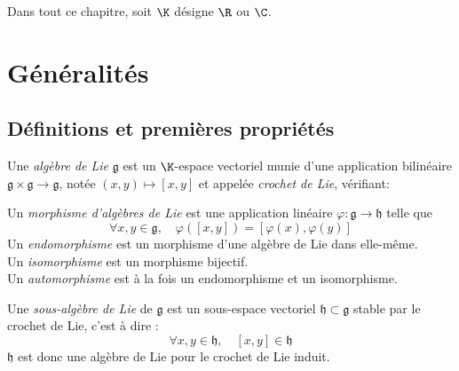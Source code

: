 
\noindent
Dans tout ce chapitre, soit $\K$ désigne $\R$ ou $\C$.
 
\section{Généralités}
\subsection{Définitions et premières propriétés}

\begin{definition}
    Une \emph{algèbre de Lie} $\mathfrak{g}$ est un $\K$-espace vectoriel munie d'une application bilinéaire $\mathfrak{g}\times \mathfrak{g} \to \mathfrak{g}$, notée $(x,y) \mapsto [x, y]$ et appelée \emph{crochet de Lie}, vérifiant:
\end{definition}

\begin{definition}
    Un \emph{morphisme d'algèbres de Lie} est une application linéaire $\varphi: \mathfrak{g} \to \mathfrak{h}$ telle que 
    $$\forall x, y \in \mathfrak{g}, \quad \varphi([x,y]) = [\varphi(x), \varphi(y)]$$
    Un \emph{endomorphisme} est un morphisme d'une algèbre de Lie dans elle-même. \\
    Un \emph{isomorphisme} est un morphisme bijectif. \\
    Un \emph{automorphisme} est à la fois un endomorphisme et un isomorphisme.
\end{definition}

\begin{definition}
    Une \emph{sous-algèbre de Lie} de $\mathfrak{g}$ est un sous-espace vectoriel $\mathfrak{h} \subset \mathfrak{g}$ stable par le crochet de Lie, c'est à dire :
    $$\forall x, y \in \mathfrak{h}, \quad [x,y] \in \mathfrak{h}$$ $\mathfrak{h}$ est donc une algèbre de Lie pour le crochet de Lie induit.
\end{definition}


